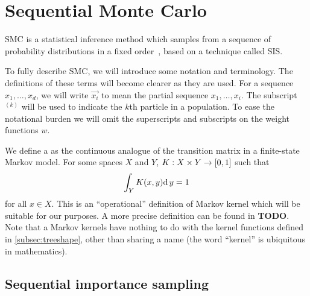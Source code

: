 \section{Sequential Monte Carlo}
\label{sec:smc}

\Gls{SMC} is a statistical inference method which samples from a sequence of
probability distributions in a fixed order~\autocite{del2006sequential}, based
on a technique called \gls{SIS}.

To fully describe \gls{SMC}, we will introduce some notation and terminology.
The definitions of these terms will become clearer as they are used. For a
sequence $x_1, \ldots, x_d$, we will write $\vec{x_i}$ to mean the partial
sequence $x_1, \ldots, x_i$. The subscript $^{(k)}$ will be used to indicate
the $k$th particle in a population. To ease the notational burden we will omit
the superscripts and subscripts on the weight functions $w$.

We define a  as the continuous analogue of the transition
matrix in a finite-state Markov model.  For some spaces $X$ and $Y$, $K : X
\times Y \to [0, 1]$ such that
\begin{align}
    \label{eq:mk}
    \int_Y K(x, y) \mathrm{d}\, y = 1
\end{align}
for all $x \in X$. This is an ``operational'' definition of Markov kernel which
will be suitable for our purposes. A more precise definition can be found in
\textbf{TODO}. Note that a Markov kernels have nothing to do with the kernel
functions defined in \cref{subsec:treeshape}, other than sharing a name (the
word ``kernel'' is ubiquitous in mathematics).

\subsection{Sequential importance sampling}
\label{subsec:sis}

